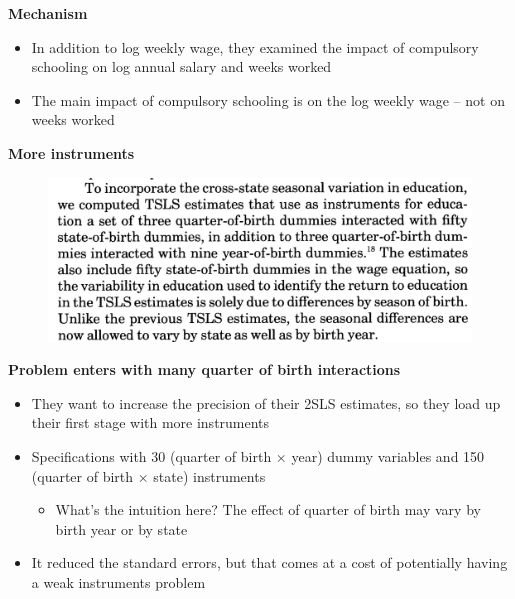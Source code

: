 \documentclass[notes=show]{beamer}
\begin{document}
\begin{frame}[plain]
	\begin{center}
	\textbf{Mechanism}
	\end{center}
	
	\begin{itemize}
	\item In addition to log weekly wage, they examined the impact of compulsory schooling on log annual salary and weeks worked
	\item The main impact of compulsory schooling is on the log weekly wage -- not on weeks worked
	\end{itemize}
\end{frame}


\begin{frame}[plain]
\begin{center}
\textbf{More instruments}
\end{center}

	\begin{figure}
	\includegraphics[scale=.25]{./lecture_includes/weak_qob1.png}
	\end{figure}
	

\end{frame}


\begin{frame}[plain]

	\begin{center}
	\textbf{Problem enters with many quarter of birth interactions}
	\end{center}
	
	\begin{itemize}
	\item They want to increase the precision of their 2SLS estimates, so they load up their first stage with more instruments
	\item Specifications with 30 (quarter of birth $\times$ year) dummy variables and 150 (quarter of birth $\times$ state) instruments
		\begin{itemize}
		\item What's the intuition here?  The effect of quarter of birth may vary by birth year or by state
		\end{itemize}
	\item It reduced the standard errors, but that comes at a cost of potentially having a weak instruments problem
	\end{itemize}
	
\end{frame}
\end{document}
